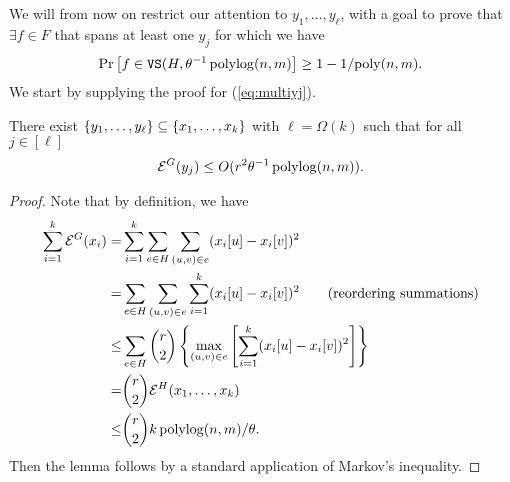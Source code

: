 \documentclass{article}
\begin{document}
We will from now on restrict our attention to $y_1,\ldots,y_{\ell}$,
with a goal to prove that $\exists f\in F$ that spans
at least one $y_j$ for which we have
\begin{align*}
    \mathrm{Pr}\left[ f\in \mathtt{VS}(H,\theta^{-1}\operatorname{polylog}(n,m) \right]
    \geq 1 - 1/\mathrm{poly}(n,m).
\end{align*}
We start by supplying the proof for (\ref{eq:multiyj}).
\begin{lemma}\label{lem:multienergyr}
    There exist $\left\{y_1,\ldots,y_{\ell} \right\} \subseteq \left\{x_1,\ldots,x_k \right\}$
    with $\ell = \Omega(k)$ such that for all $j\in[\ell]$
    \begin{align*}
        \mathcal{E}^G(y_j) \leq O(r^2\theta^{-1}\operatorname{polylog}(n,m)).
    \end{align*}
\end{lemma}
\begin{proof}
    Note that by definition, we have
    \begin{align*}
        \sum_{i=1}^{k} \mathcal{E}^G(x_i) =
        & \sum_{i=1}^{k} \sum_{e\in H}\sum_{(u,v)\in e}
        (x_i[u] - x_i[v])^2 \\
        = 
        & \sum_{e\in H} \sum_{(u,v)\in e} \sum_{i=1}^{k}
        (x_i[u] - x_i[v])^2 \qquad \text{(reordering summations)} \\
        \leq & \sum_{e\in H} \binom{r}{2}
         \left\{ \max_{(u,v)\in e} \left[ \sum_{i=1}^{k}
        (x_i[u] - x_i[v])^2 \right]  \right\} \\
        = & \binom{r}{2} \mathcal{E}^H(x_1,\ldots,x_k) \\
        \leq & \binom{r}{2} k \operatorname{polylog}(n,m) / \theta.
    \end{align*}
    Then the lemma follows by a standard application of Markov's inequality.
\end{proof}
\end{document}

